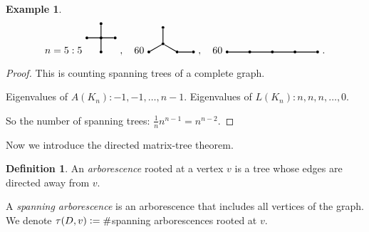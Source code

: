 \documentclass{report}
\newcommand{\defeq}{\vcentcolon=}
\theoremstyle{definition}
\newtheorem{definition}{Definition}[section]
\newtheorem{example}{Example}[section]
\theoremstyle{remark}
\numberwithin{equation}{section}
\begin{document}
\begin{example}
    \[n = 5: 5\ \begin{tikzpicture}
        \node[shape=circle, fill=black, scale = 0.3] (A1) at (0, 0) {};
        \node[shape=circle, fill=black, scale = 0.3] (A3) at (1, 0) {};
        \node[shape=circle, fill=black, scale = 0.3] (A2) at (0.5, 0) {};
        \node[shape=circle, fill=black, scale = 0.3] (A4) at (0.5, 0.5) {};
        \node[shape=circle, fill=black, scale = 0.3] (A5) at (0.5, -0.5) {};
        \draw[thick] (A1) to (A3);
        \draw[thick] (A5) to (A4);
    \end{tikzpicture}\ , \quad 60\ \begin{tikzpicture}
        \node[shape=circle, fill=black, scale = 0.3] (A1) at (0, 0) {};
        \node[shape=circle, fill=black, scale = 0.3] (A2) at (1, 0) {};
        \node[shape=circle, fill=black, scale = 0.3] (A3) at (0.5, {0.5*sqrt(3)}) {};
        \node[shape=circle, fill=black, scale = 0.3] (A4) at (0.5, {0.5/3*sqrt(3)}) {};
        \node[shape=circle, fill=black, scale = 0.3] (A5) at ({1+1/3*sqrt(3)}, 0) {};
        \draw[thick] (A1) to (A4) to (A3);
        \draw[thick] (A5) to (A2) to (A4);
    \end{tikzpicture}\ ,\quad 60\ 
    \begin{tikzpicture}
        \node[shape=circle, fill=black, scale = 0.3] (A1) at (0, 0) {};
        \node[shape=circle, fill=black, scale = 0.3] (A2) at (0.8, 0) {};
        \node[shape=circle, fill=black, scale = 0.3] (A3) at (1.6, 0) {};
        \node[shape=circle, fill=black, scale = 0.3] (A4) at (2.4, 0) {};
        \node[shape=circle, fill=black, scale = 0.3] (A5) at (3.2, 0) {};
        \draw[thick] (A1) to (A5);
    \end{tikzpicture}\ .\]
\end{example}
\begin{proof}
    This is counting spanning trees of a complete graph.
    
    Eigenvalues of $A(K_n): -1, -1, \ldots, n - 1$. Eigenvalues of $L(K_n): n, n, n, \ldots, 0$.

    So the number of spanning trees: $\frac{1}{n}n^{n-1} = n^{n - 2}$.
\end{proof}

Now we introduce the directed matrix-tree theorem.
\begin{definition}
    An \emph{arborescence} rooted at a vertex $v$ is a tree whose edges are directed away from $v$.

    A \emph{spanning arborescence} is an arborescence that includes all vertices of the graph. We denote $\tau(D, v) \defeq \#$spanning arborescences rooted at $v$.
\end{definition}
\end{document}
